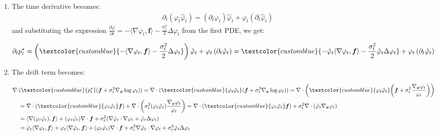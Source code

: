 \documentclass{article}
\newcommand{\bluetext}[1]{\textcolor{customblue}{#1}}
\begin{document}
\begin{enumerate}
    \item The time derivative becomes:
    \begin{align}
        \partial_t(\varphi_t\hat{\varphi}_t)=\left(\partial_t \varphi_t\right)\hat{\varphi}_t+\varphi_t \left(\partial_t \hat{\varphi}_t\right)
    \end{align}
    and substituting the expression $\frac{\partial \varphi}{\partial t } =-\langle\nabla \varphi_t, \boldsymbol{f}\rangle-\frac{\sigma_t^2}{2} \Delta \varphi_t$ from the first PDE, we get:
    \begin{small}
    \begin{align}
        \partial_t p^\star_t=\left(\bluetext{-\langle\nabla \varphi_t, \boldsymbol{f}\rangle-\frac{\sigma_t^2}{2} \Delta \varphi_t}\right)\hat{\varphi}_t+\varphi_t \left(\partial_t \hat{\varphi}_t\right)=\bluetext{-\hat\varphi_t\langle\nabla \varphi_t, \boldsymbol{f}\rangle-\frac{\sigma_t^2}{2} \hat\varphi_t\Delta \varphi_t}+\varphi_t \left(\partial_t \hat{\varphi}_t\right)\label{eq:hopf-cole-proof1}
    \end{align}
    \end{small}
    \item The drift term becomes:
    \begin{small}
    \begin{align}
        \nabla\cdot &(\bluetext{p^\star_t}(\boldsymbol{f}+\sigma^2_t\nabla _{\boldsymbol{x}} \log\varphi_t))=\nabla\cdot (\bluetext{\varphi_t\hat\varphi_t}(\boldsymbol{f}+\sigma^2_t\nabla _{\boldsymbol{x}} \log\varphi_t))=\nabla\cdot \bigg(\bluetext{\varphi_t\hat\varphi_t}\bigg(\boldsymbol{f}+\sigma^2_t\frac{\nabla _{\boldsymbol{x}} \varphi_t}{\varphi_t}\bigg)\bigg)\nonumber\\
        &=\nabla\cdot (\bluetext{\varphi_t\hat\varphi_t}\boldsymbol{f})+\nabla\cdot \bigg(\sigma^2_t(\varphi_t\hat\varphi_t)\frac{\nabla _{\boldsymbol{x}} \varphi_t}{\varphi_t}\bigg)=\nabla\cdot (\bluetext{\varphi_t\hat\varphi_t}\boldsymbol{f})+\sigma^2_t\nabla\cdot (\hat\varphi_t\nabla _{\boldsymbol{x}} \varphi_t)\nonumber\\
        &=\langle\nabla (\varphi_t\hat\varphi_t), \boldsymbol{f}\rangle +(\varphi_t\hat\varphi_t)\nabla\cdot \boldsymbol{f} +\sigma^2_t(\nabla \hat{\varphi}_t\cdot \nabla \varphi_t+\hat{\varphi}_t\Delta \varphi_t)\nonumber\\
        &=\hat\varphi_t\langle\nabla \varphi_t, \boldsymbol{f}\rangle +\varphi_t\langle\nabla \hat\varphi_t, \boldsymbol{f}\rangle +(\varphi_t\hat\varphi_t)\nabla\cdot \boldsymbol{f} +\sigma^2_t\nabla \hat{\varphi}_t\cdot \nabla \varphi_t+\sigma^2_t\hat{\varphi}_t\Delta \varphi_t\label{eq:hopf-cole-proof2}

\end{align}
\end{small}
\end{enumerate}
\end{document}
